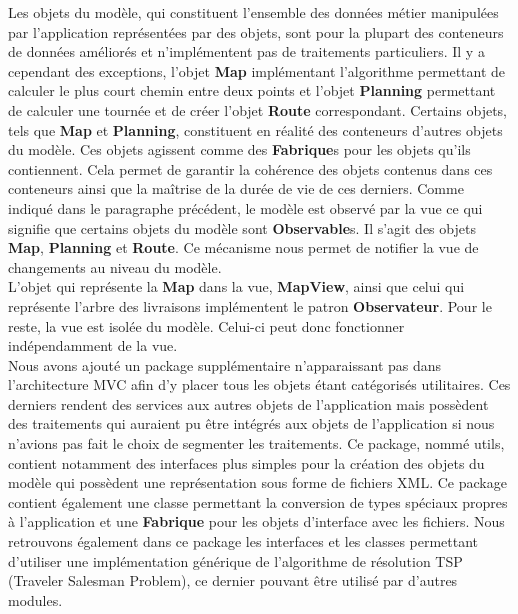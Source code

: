 \documentclass[paper=a4,fontsize=11pt]{report}
\numberwithin{equation}{section}		%
\numberwithin{figure}{section}		%
\numberwithin{table}{section}		%
\renewcommand{\bf}[1]{\textbf{#1}}
\begin{document}
Les objets du modèle, qui constituent l'ensemble des données métier manipulées par l'application représentées par des objets, sont pour la plupart des conteneurs de données améliorés et n'implémentent pas de traitements particuliers. Il y a cependant des exceptions, l'objet \bf{Map} implémentant l'algorithme permettant de calculer le plus court chemin entre deux points et l'objet \bf{Planning} permettant de calculer une tournée et de créer l'objet \bf{Route} correspondant. Certains objets, tels que \bf{Map} et \bf{Planning}, constituent en réalité des conteneurs d'autres objets du modèle. Ces objets agissent comme des \bf{Fabrique}s pour les objets qu'ils contiennent. Cela permet de garantir la cohérence des objets contenus dans ces conteneurs ainsi que la maîtrise de la durée de vie de ces derniers. Comme indiqué dans le paragraphe précédent, le modèle est observé par la vue ce qui signifie que certains objets du modèle sont \bf{Observable}s. Il s'agit des objets \bf{Map}, \bf{Planning} et \bf{Route}. Ce mécanisme nous permet de notifier la vue de changements au niveau du modèle. \\

L'objet qui représente la \bf{Map} dans la vue, \bf{MapView}, ainsi que celui qui représente l'arbre des livraisons implémentent le patron \bf{Observateur}. Pour le reste, la vue est isolée du modèle. Celui-ci peut donc fonctionner indépendamment de la vue. \\

Nous avons ajouté un package supplémentaire n'apparaissant pas dans l'architecture MVC afin d'y placer tous les objets étant catégorisés utilitaires. Ces  derniers rendent des services aux autres objets de l'application mais possèdent des traitements qui auraient pu être intégrés aux objets de l'application si nous n'avions pas fait le choix de segmenter les traitements. Ce package, nommé utils, contient notamment des interfaces plus simples pour la création des objets du modèle qui possèdent une représentation sous forme de fichiers XML. Ce package contient également une classe permettant la conversion de types spéciaux propres à l'application et une \bf{Fabrique} pour les objets d'interface avec les fichiers. Nous retrouvons également dans ce package les interfaces et les classes permettant d'utiliser une implémentation générique de l'algorithme de résolution TSP (Traveler Salesman Problem), ce dernier pouvant être utilisé par d'autres modules. \\
\end{document}
